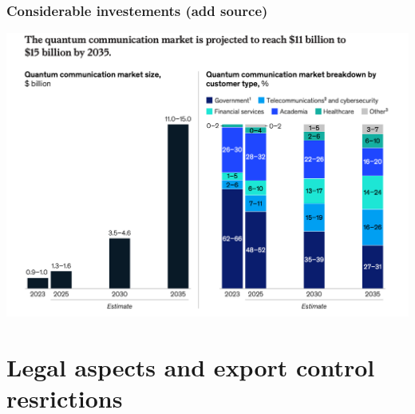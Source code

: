 \documentclass{beamer}
\begin{document}
\begin{frame}
\frametitle{Considerable investements (add source)}


\centerline{\includegraphics[width=0.9\linewidth]{qcfigures/image6.png}}

\end{frame}



    

\section{Legal aspects and export control resrictions}
\end{document}
